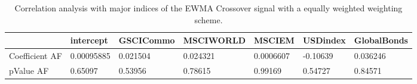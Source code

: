 \begin{table}[H]
\centering
\begin{tabular}{lllllll}
\hline& intercept & GSCICommo & MSCIWORLD & MSCIEM & USDindex & GlobalBonds \\ 
\hline 
Coefficient AF & 0.00095885 & 0.021504 & 0.024321 & 0.0006607 & -0.10639 & 0.036246 \\ 
pValue AF & 0.65097 & 0.53956 & 0.78615 & 0.99169 & 0.54727 & 0.84571 \\ 
\hline
\end{tabular}
\caption{Correlation analysis with major indices of the EWMA Crossover signal with a equally weighted weighting scheme.}
\label{MBBSEWNR_AFACTOR}
\end{table}